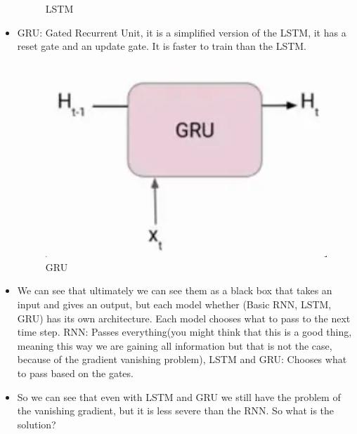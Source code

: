 \documentclass{article}
\begin{document}
\begin{itemize}
\begin{figure}[H]
      \caption{LSTM}
    \end{figure}
    \item GRU: Gated Recurrent Unit, it is a simplified version of the LSTM, it has a reset gate and an update gate. It is faster to train than the LSTM. 
    \begin{figure}[H]
      \centering
      \includegraphics[width = \textwidth]{Images/gru.png}
      \caption{GRU}
    \end{figure}
    \item We can see that ultimately we can see them as a black box that takes an input and gives an output, but each model whether (Basic RNN, LSTM, GRU) has its own architecture. Each model chooses what to pass to the next time step. RNN: Passes everything(you might think that this is a good thing, meaning this way we are gaining all information but that is not the case, because of the gradient vanishing problem), LSTM and GRU: Chooses what to pass based on the gates.
    \item So we can see that even with LSTM and GRU we still have the problem of the vanishing gradient, but it is less severe than the RNN. So what is the solution? 
  \end{itemize}
\end{document}

